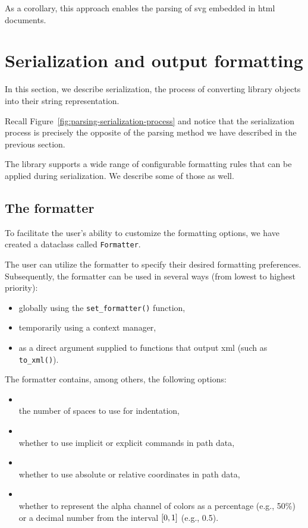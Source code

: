 As a corollary, this approach enables the parsing of \gls{svg} embedded in \gls{html} documents.

\section{Serialization and output formatting}\label{impl:serialization}

In this section, we describe serialization, the process of converting library objects into their string representation. 

Recall Figure~\ref{fig:parsing-serialization-process} and notice that the serialization process is precisely the opposite of the parsing method we have described in the previous section.

The library supports a wide range of configurable formatting rules that can be applied during serialization. We describe some of those as well.

\subsection{The formatter}

To facilitate the user's ability to customize the formatting options, we have created a dataclass called \texttt{Formatter}. 

The user can utilize the formatter to specify their desired formatting preferences. Subsequently, the formatter can be used in several ways (from lowest to highest priority):
\begin{itemize}
    \item globally using the \texttt{set\_formatter()} function,
    \item temporarily using a context manager,
    \item as a direct argument supplied to functions that output \gls{xml} (such as \texttt{to\_xml()}).
\end{itemize}

The formatter contains, among others, the following options:
\begin{itemize}
    \item {} \\
    the number of spaces to use for indentation,
    \item {} \\
    whether to use implicit or explicit commands in path data,
    \item {} \\
    whether to use absolute or relative coordinates in path data,
    \item {} \\
    whether to represent the alpha channel of colors as a percentage (e.g., 50\%) or a decimal number from the interval $\interval[scaled]{0}{1}$ (e.g., 0.5).
\end{itemize}

